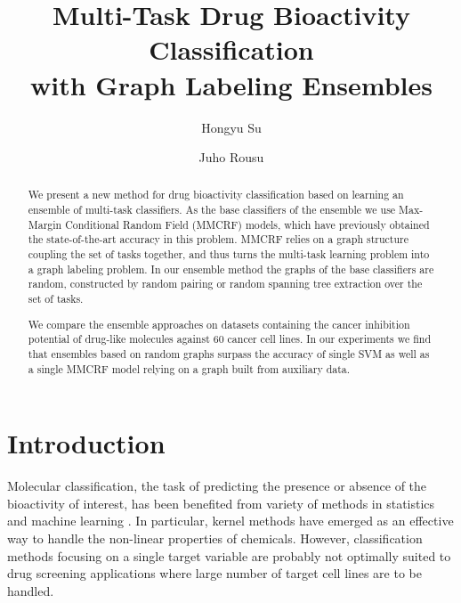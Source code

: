 \documentclass[runningheads,a4paper]{llncs}
\begin{document}
\mainmatter  

\title{Multi-Task Drug Bioactivity Classification \\ with Graph Labeling Ensembles }
\author{Hongyu Su \and Juho Rousu}

\maketitle


\begin{abstract}
	We present a new method for drug bioactivity classification based on learning an ensemble of multi-task classifiers. As the base classifiers of the ensemble 
	we use Max-Margin Conditional Random Field (MMCRF) models, which have previously obtained the state-of-the-art accuracy in this problem.
	MMCRF relies on a graph structure coupling the set of tasks together, and thus turns the multi-task learning problem into a graph labeling problem.
	In our ensemble method the graphs of the base classifiers are random, constructed by random pairing or random spanning tree extraction over the set of tasks.
	
	We compare the ensemble approaches on datasets containing the cancer inhibition potential of drug-like molecules against $60$ cancer cell lines.
	In our experiments we find that  ensembles based on random graphs surpass the accuracy of single SVM as well as a single MMCRF model relying on a graph
	built from auxiliary data.
	
\end{abstract}



\section{Introduction}

Molecular classification, the task of predicting the presence or absence of the bioactivity of interest, has been benefited from variety of methods in statistics and machine learning \cite{olga10}. In particular, kernel methods \cite{ralaivola05,trotter01,ceroni07,olga10} have emerged as an effective way to handle the non-linear properties of chemicals. However, classification methods focusing on a single target variable are probably not optimally suited to drug screening applications where large number of target cell lines are to be handled.  
\end{document}
